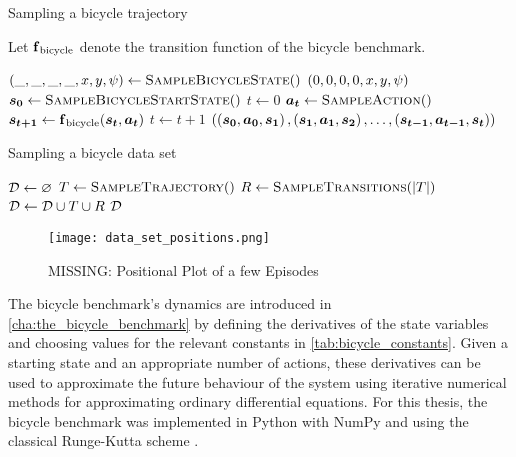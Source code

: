 \begin{algorithm}[p]
    \caption{Sampling a bicycle trajectory}
    \label{alg:bicycle_trajectories}
    Let $\DynBicycle$ denote the transition function of the bicycle benchmark.
    \begin{algorithmic}[1]
            \State $\Bicycle*{\_, \_, \_, \_, x, y, \psi} \gets \Call{SampleBicycleState}$
            \State \Return $\Bicycle*{0, 0, 0, 0, x, y, \psi}$
        \EndFunction
        \Statex
            \State $\mat{s_0} \gets \Call{SampleBicycleStartState}$
            \State $t \gets 0$
                \State $\mat{a_t} \gets \Call{SampleAction}$
                \State $\mat{s_{t+1}} \gets \DynBicycle(\mat{s_t}, \mat{a_t})$
                \State $t \gets t + 1$
            \EndWhile
            \State \Return $\left( \left( \mat{s_0}, \mat{a_0}, \mat{s_1} \right), \left( \mat{s_1}, \mat{a_1}, \mat{s_2} \right), \dots, \left( \mat{s_{t-1}}, \mat{a_{t-1}}, \mat{s_t} \right) \right)$
        \EndFunction
    \end{algorithmic}
\end{algorithm}
\begin{algorithm}[p]
    \caption{Sampling a bicycle data set}
    \label{alg:bicycle_data_set}
    \begin{algorithmic}[1]
            \State $\D \gets \emptyset$
                \State $T \gets \Call{SampleTrajectory}$
                \State $R \gets \Call{SampleTransitions}{\abs{T}}$
                \State $\D \gets \D \cup T \cup R$
            \EndWhile
            \State \Return $\D$
        \EndFunction
    \end{algorithmic}
\end{algorithm}
\begin{figure}[p]
    \centering
    \texttt{[image: data\_set\_positions.png]}
    \caption{MISSING: Positional Plot of a few Episodes}
    \label{fig:data_set_plot}
\end{figure}
The bicycle benchmark's dynamics are introduced in \cref{cha:the_bicycle_benchmark} by defining the derivatives of the state variables and choosing values for the relevant constants in \cref{tab:bicycle_constants}.
Given a starting state and an appropriate number of actions, these derivatives can be used to approximate the future behaviour of the system using iterative numerical methods for approximating ordinary differential equations.
For this thesis, the bicycle benchmark was implemented in Python \cite{van_rossum_python_1995} with NumPy \cite{walt_numpy_2011} and using the classical Runge-Kutta scheme \cite{kutta_beitrag_1901}.

